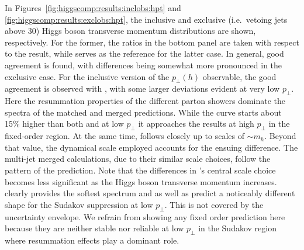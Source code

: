 In Figures~\ref{fig:higgscomp:results:inclobs:hpt} and
\ref{fig:higgscomp:results:exclobs:hpt}, the inclusive and exclusive
(i.e.~vetoing jets above $30$\gev) Higgs boson transverse momentum
distributions are shown, respectively.  For the former, the ratios in
the bottom panel are taken with respect to the \HqT result, while
\Powheg \NNLOPS serves as the reference for the latter case. In
general, good agreement is found, with differences being somewhat more
pronounced in the exclusive case. For the inclusive version of the
$p_\perp(h)$ observable, the good agreement is observed with \HqT,
with some larger deviations evident at very low $p_\perp$. Here the 
resummation properties of the different parton showers dominate the 
spectra of the matched and merged predictions. While the
\Sherpa \NNLOPS curve starts about 15\% higher than both \HqT and \Powheg 
\NNLOPS at low $p_\perp$ it approaches the \HqT results at high $p_\perp$ 
in the fixed-order region. At the same time, \Powheg \NNLOPS follows 
\HqT closely up to scales of $\sim m_h$. Beyond that value, the 
dynamical scale employed \Powheg \NNLOPS accounts for the ensuing 
difference. The multi-jet merged calculations, due to their similar 
scale choices, follow the pattern of the \Powheg \NNLOPS prediction.
Note that the differences in \MGaMC's central scale
choice becomes less significant as the Higgs boson transverse momentum
increases. \Herwig clearly provides the softest spectrum and \Sherpa
as well as \MGaMC predict a noticeably different shape for the Sudakov
suppression at low $p_\perp$. This is not covered by the \HqT
uncertainty envelope. We refrain from showing any fixed order
prediction here because they are neither stable nor reliable at low
$p_\perp$ in the Sudakov region where resummation effects play a 
dominant role.

